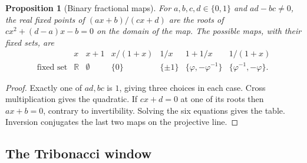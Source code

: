 \documentclass[11pt,reqno]{amsart}
\newtheorem{proposition}[theorem]{Proposition}
\theoremstyle{definition}
\theoremstyle{remark}
\numberwithin{equation}{section}
\newcommand{\R}{\mathbb{R}}
\begin{document}
\begin{proposition}[Binary fractional maps]\label{m9:fractional}
For \(a,b,c,d\in\{0,1\}\) and \(ad-bc\ne0\), the real fixed
points of \((ax+b)/(cx+d)\) are the roots of
\(cx^2+(d-a)x-b=0\) on the domain of the map. The possible maps,
with their fixed sets, are
\[
\begin{array}{c|cccccc}
 & x & x+1 & x/(1+x) & 1/x & 1+1/x & 1/(1+x)\\
\text{fixed set}&\R&\emptyset&\{0\}&\{\pm1\}
 &\{\varphi,-\varphi^{-1}\}&\{\varphi^{-1},-\varphi\}.
\end{array}
\]
\end{proposition}
\begin{proof}
Exactly one of \(ad,bc\) is \(1\), giving three choices in each
case. Cross multiplication gives the quadratic. If \(cx+d=0\)
at one of its roots then \(ax+b=0\), contrary to invertibility.
Solving the six equations gives the table. Inversion conjugates
the last two maps on the projective line.
\end{proof}

\subsection{The Tribonacci window}
\end{document}
